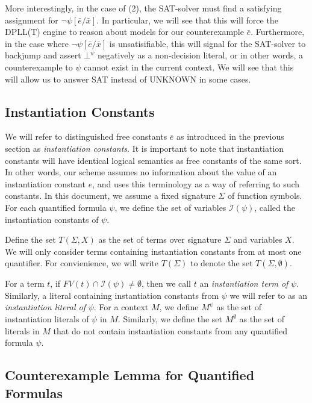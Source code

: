 \documentclass{llncs}
\begin{document}
More interestingly, in the case of (2), the SAT-solver must find a satisfying assignment for $\neg \psi[\bar{e}/\bar{x}]$.
In particular, we will see that this will force the DPLL(T) engine to reason about models for our counterexample $\bar{e}$.
Furthermore, in the case where $\neg \psi[\bar{e}/\bar{x}]$ is unsatisifiable, this will signal for the SAT-solver to backjump and assert $\bot^\psi$ negatively as a non-decision literal, or in other words, a counterexample to $\psi$ cannot exist in the current context.
We will see that this will allow us to answer SAT instead of UNKNOWN in some cases.

\subsection{Instantiation Constants}

We will refer to distinguished free constants $\bar{e}$ as introduced in the previous section as \emph{instantiation constants}.
It is important to note that instantiation constants will have identical logical semantics as free constants of the same sort.
In other words, our scheme assumes no information about the value of an instantiation constant $e$, and uses this terminology as a way of referring to such constants.
In this document, we assume a fixed signature $\Sigma$ of function symbols.
For each quantified formula $\psi$, we define the set of variables $\mathcal{I}( \psi )$, called the instantiation constants of $\psi$.

Define the set $T( \Sigma, X )$ as the set of terms over signature $\Sigma$ and variables $X$.
We will only consider terms containing instantiation constants from at most one quantifier.
For convienience, we will write $T( \Sigma )$ to denote the set $T( \Sigma, \emptyset )$.

For a term $t$, if $FV( t ) \cap \mathcal{I}( \psi ) \neq \emptyset$, then we call $t$ an \emph{instantiation term of} $\psi$. 
Similarly, a literal containing instantiation constants from $\psi$ we will refer to as an \emph{instantiation literal of} $\psi$.
For a context $M$, we define $M^\psi$ as the set of instantiation literals of $\psi$ in $M$.
Similarly, we define the set $M^\emptyset$ as the set of literals in $M$ that do not contain instantiation constants from any quantified formula $\psi$.

\subsection{Counterexample Lemma for Quantified Formulas}
\end{document}
